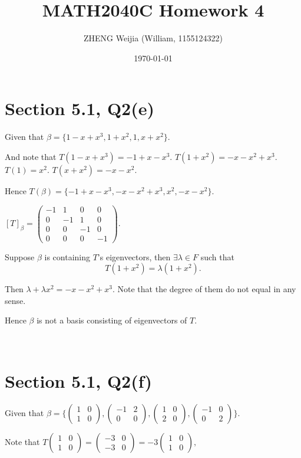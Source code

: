 \documentclass[12pt]{article}%
\begin{document}
\title{MATH2040C Homework 4}
\author{ZHENG Weijia (William, 1155124322)}
\date{\today}
\maketitle



\section{Section 5.1, Q2(e)}

Given that $\beta = \{1-x+x^3,1+x^2,1,x+x^2\}.$ 

And note that $T(1-x+x^3)=-1+x-x^3.$ $T(1+x^2)=-x-x^2+x^3.$ $T(1)=x^2.$ $T(x+x^2)=-x-x^2.$

Hence $T(\beta)=\{-1+x-x^3,-x-x^2+x^3,x^2, -x-x^2\}.$

$[T]_\beta =\begin{pmatrix}-1&1&0&0\\0&-1&1&0\\0&0&-1&0\\0&0&0&-1\end{pmatrix}.$

Suppose $\beta$ is containing $T$'s eigenvectors, then $\exists \lambda \in F$ such that $$T(1+x^2)=\lambda(1+x^2).$$

Then $\lambda + \lambda x^2 = -x-x^2+x^3.$ Note that the degree of them do not equal in any sense. 

Hence $\beta$ is not a basis consisting of eigenvectors of $T.$

~\ 

\section{Section 5.1, Q2(f)}
Given that $\beta = \{\begin{pmatrix}1&0\\1&0\end{pmatrix},\begin{pmatrix}-1&2\\0&0\end{pmatrix},\begin{pmatrix}1&0\\2&0\end{pmatrix},\begin{pmatrix}-1&0\\0&2\end{pmatrix}\}.$

Note that $T\begin{pmatrix}1&0\\1&0\end{pmatrix}=\begin{pmatrix}-3&0\\-3&0\end{pmatrix}=-3\begin{pmatrix}1&0\\1&0\end{pmatrix},$
\end{document}

